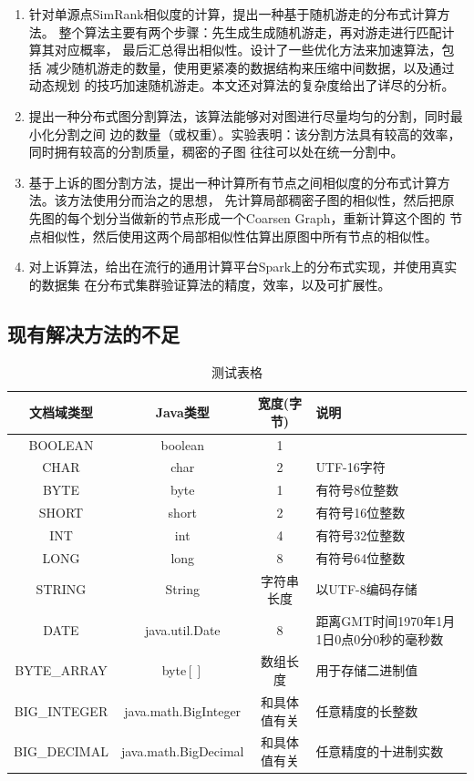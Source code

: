 \documentclass[master]{njuthesis}
\begin{document}
\begin{enumerate}

\item 针对单源点SimRank相似度的计算，提出一种基于随机游走的分布式计算方法。
整个算法主要有两个步骤：先生成生成随机游走，再对游走进行匹配计算其对应概率，
最后汇总得出相似性。设计了一些优化方法来加速算法，包括
减少随机游走的数量，使用更紧凑的数据结构来压缩中间数据，以及通过动态规划
的技巧加速随机游走。本文还对算法的复杂度给出了详尽的分析。

\item 提出一种分布式图分割算法，该算法能够对对图进行尽量均匀的分割，同时最小化分割之间
边的数量（或权重）。实验表明：该分割方法具有较高的效率，同时拥有较高的分割质量，稠密的子图
往往可以处在统一分割中。

\item 基于上诉的图分割方法，提出一种计算所有节点之间相似度的分布式计算方法。该方法使用分而治之的思想，
先计算局部稠密子图的相似性，然后把原先图的每个划分当做新的节点形成一个Coarsen Graph，重新计算这个图的
节点相似性，然后使用这两个局部相似性估算出原图中所有节点的相似性。

\item 对上诉算法，给出在流行的通用计算平台Spark上的分布式实现，并使用真实的数据集
在分布式集群验证算法的精度，效率，以及可扩展性。

\end{enumerate}

\subsection{现有解决方法的不足}

\begin{table}
  \centering
  \begin{tabular}{cccp{38mm}}
    \toprule
    \textbf{文档域类型} & \textbf{Java类型} & \textbf{宽度(字节)} & \textbf{说明} \\
    \midrule
    BOOLEAN  & boolean &  1  & \\
    CHAR     & char    &  2  & UTF-16字符 \\
    BYTE     & byte    &  1  & 有符号8位整数 \\
    SHORT    & short   &  2  & 有符号16位整数 \\
    INT      & int     &  4  & 有符号32位整数 \\
    LONG     & long    &  8  & 有符号64位整数 \\
    STRING   & String  &  字符串长度  & 以UTF-8编码存储 \\
    DATE     & java.util.Date & 8 & 距离GMT时间1970年1月1日0点0分0秒的毫秒数 \\
    BYTE\_ARRAY & byte$[]$ & 数组长度 & 用于存储二进制值 \\
    BIG\_INTEGER & java.math.BigInteger & 和具体值有关 & 任意精度的长整数 \\
    BIG\_DECIMAL & java.math.BigDecimal & 和具体值有关 & 任意精度的十进制实数 \\
    \bottomrule
  \end{tabular}
  \caption{测试表格}\label{table:test1}
\end{table}
\end{document}
